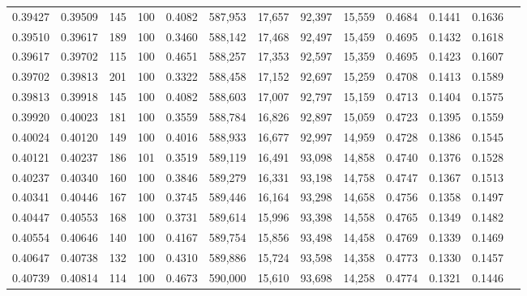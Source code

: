 \begin{tabular}{rrrrrrrrrrrrr}
0.39427 & 0.39509 &   145 & 100 &                                     0.4082 & 587,953 &  17,657 &  92,397 &  15,559 & 0.4684 & 0.1441 & 0.1636 \\
0.39510 & 0.39617 &   189 & 100 &                                     0.3460 & 588,142 &  17,468 &  92,497 &  15,459 & 0.4695 & 0.1432 & 0.1618 \\
0.39617 & 0.39702 &   115 & 100 &                                     0.4651 & 588,257 &  17,353 &  92,597 &  15,359 & 0.4695 & 0.1423 & 0.1607 \\
0.39702 & 0.39813 &   201 & 100 &                                     0.3322 & 588,458 &  17,152 &  92,697 &  15,259 & 0.4708 & 0.1413 & 0.1589 \\
0.39813 & 0.39918 &   145 & 100 &                                     0.4082 & 588,603 &  17,007 &  92,797 &  15,159 & 0.4713 & 0.1404 & 0.1575 \\
0.39920 & 0.40023 &   181 & 100 &                                     0.3559 & 588,784 &  16,826 &  92,897 &  15,059 & 0.4723 & 0.1395 & 0.1559 \\
0.40024 & 0.40120 &   149 & 100 &                                     0.4016 & 588,933 &  16,677 &  92,997 &  14,959 & 0.4728 & 0.1386 & 0.1545 \\
0.40121 & 0.40237 &   186 & 101 &                                     0.3519 & 589,119 &  16,491 &  93,098 &  14,858 & 0.4740 & 0.1376 & 0.1528 \\
0.40237 & 0.40340 &   160 & 100 &                                     0.3846 & 589,279 &  16,331 &  93,198 &  14,758 & 0.4747 & 0.1367 & 0.1513 \\
0.40341 & 0.40446 &   167 & 100 &                                     0.3745 & 589,446 &  16,164 &  93,298 &  14,658 & 0.4756 & 0.1358 & 0.1497 \\
0.40447 & 0.40553 &   168 & 100 &                                     0.3731 & 589,614 &  15,996 &  93,398 &  14,558 & 0.4765 & 0.1349 & 0.1482 \\
0.40554 & 0.40646 &   140 & 100 &                                     0.4167 & 589,754 &  15,856 &  93,498 &  14,458 & 0.4769 & 0.1339 & 0.1469 \\
0.40647 & 0.40738 &   132 & 100 &                                     0.4310 & 589,886 &  15,724 &  93,598 &  14,358 & 0.4773 & 0.1330 & 0.1457 \\
0.40739 & 0.40814 &   114 & 100 &                                     0.4673 & 590,000 &  15,610 &  93,698 &  14,258 & 0.4774 & 0.1321 & 0.1446 \\

\end{tabular}
